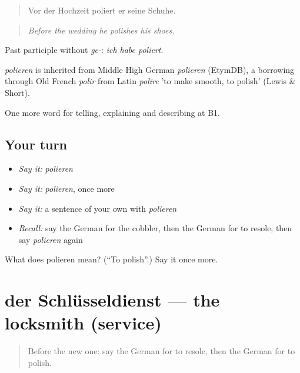 \begin{quote}
Vor der Hochzeit poliert er seine Schuhe.
\end{quote}

\begin{quote}
\emph{Before the wedding he polishes his shoes.}
\end{quote}

Past participle without \emph{ge-}: \emph{ich habe poliert}.

\begin{cousinweb}
\emph{polieren} is inherited from Middle High German \emph{polieren} (EtymDB), a borrowing through Old French \emph{polir} from Latin \emph{polīre} 'to make smooth, to polish' (Lewis \& Short).
\end{cousinweb}

\begin{grammarlens}[title={What you've built}]
One more word for telling, explaining and describing at B1.
\end{grammarlens}

\subsection*{Your turn}
\begin{itemize}
\raggedright
  \item \emph{Say it:} \emph{polieren}
  \item \emph{Say it:} \emph{polieren}, once more
  \item \emph{Say it:} a sentence of your own with \emph{polieren}
  \item \emph{Recall:} say the German for the cobbler, then the German for to resole, then say \emph{polieren} again
\end{itemize}

\begin{tcolorbox}[breakable,colback=teal!4,colframe=teal!35!black,title={Before you move on}]
What does polieren mean? (\textquotedblleft{}To polish\textquotedblright{}.) Say it once more.
\end{tcolorbox}
\section[der Schlüsseldienst]{der Schlüsseldienst — the locksmith (service)}

\label{lesson:GE-C445-schluesseldienst}



\begin{quote}
Before the new one: say the German for to resole, then the German for to polish.
\end{quote}

